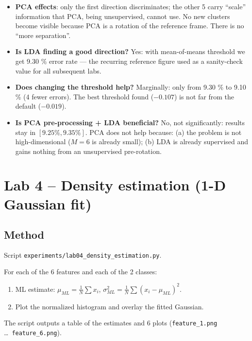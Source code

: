 \documentclass[11pt,a4paper]{article}
\begin{document}
\begin{itemize}
\item \textbf{PCA effects}: only the first direction discriminates;
      the other 5 carry ``scale'' information that PCA, being
      unsupervised, cannot use. No new clusters become visible because
      PCA is a rotation of the reference frame. There is no ``more
      separation''.
\item \textbf{Is LDA finding a good direction?} Yes: with
      mean-of-means threshold we get 9.30 \% error rate --- the
      recurring reference figure used as a sanity-check value for all
      subsequent labs.
\item \textbf{Does changing the threshold help?} Marginally: only
      from 9.30 \% to 9.10 \% (4 fewer errors). The best threshold
      found ($-0.107$) is not far from the default ($-0.019$).
\item \textbf{Is PCA pre-processing + LDA beneficial?} No, not
      significantly: results stay in $[9.25\%, 9.35\%]$. PCA does not
      help because: (a) the problem is not high-dimensional ($M=6$ is
      already small); (b) LDA is already supervised and gains nothing
      from an unsupervised pre-rotation.
\end{itemize}

\section{Lab 4 -- Density estimation (1-D Gaussian fit)}\label{sec:lab4}

\subsection{Method}

Script \texttt{experiments/lab04\_density\_estimation.py}.

For each of the 6 features and each of the 2 classes:
\begin{enumerate}
\item ML estimate: $\mu_{ML} = \frac{1}{N}\sum x_i$,
      $\sigma^2_{ML} = \frac{1}{N}\sum (x_i - \mu_{ML})^2$.
\item Plot the normalized histogram and overlay the fitted Gaussian.
\end{enumerate}

The script outputs a table of the estimates and 6 plots
(\texttt{feature\_1.png} \ldots\ \texttt{feature\_6.png}).
\end{document}
